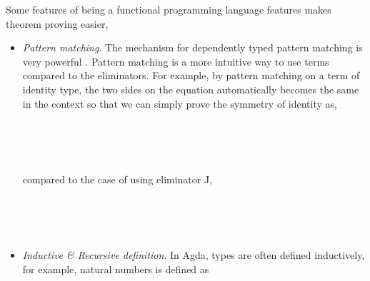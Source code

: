 Some features of being a functional programming language features makes theorem proving easier,

\begin{itemize}

\item \textit{Pattern matching}. The mechanism for dependently typed pattern matching is very powerful \cite{alti:pisigma-new}. Pattern matching is a more intuitive way to use terms compared to the eliminators. For example, by pattern matching on a term of identity type, the two sides on the equation automatically becomes the same in the context so that we can simply prove the symmetry of identity as,

\begin{code}
\\
\> \AgdaSymbol{:} \AgdaSymbol{\{} \AgdaSymbol{:} \AgdaSymbol{\}\{}  \AgdaSymbol{:} \AgdaSymbol{\}}        \<%
\\
\>  \AgdaSymbol{=} \<%
\\
\end{code}
compared to the case of using eliminator J,

\begin{code}\label{symmetry}
\\
\> \AgdaSymbol{:} \AgdaSymbol{\{} \AgdaSymbol{:} \AgdaSymbol{\}\{}  \AgdaSymbol{:} \AgdaSymbol{\}}        \<%
\\
\> \AgdaSymbol{=}     \AgdaBound{\_}    \AgdaSymbol{)}  \AgdaBound{\_}  \AgdaSymbol{)} \AgdaSymbol{\_} \AgdaSymbol{\_}\<%
\\
\end{code}

\item \textit{Inductive \& Recursive definition}. In Agda, types are often defined inductively, for example, natural numbers is defined as


\end{itemize}
